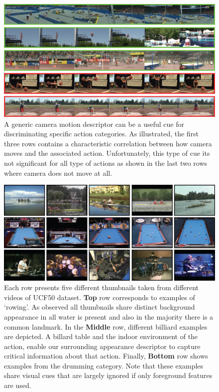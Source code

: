 \begin{figure}[t!]
\begin{center}
\includegraphics[width=0.98\linewidth]{fig/camMotion.png}
\end{center}
\caption{A generic camera motion descriptor can be a useful cue for discriminating specific action categories. As illustrated, the first three rows contains a characteristic correlation between how camera moves and the associated action. Unfortunately, this type of cue its not significant for all type of actions as shown in the last two rows where camera does not move at all.}
\label{fig:camMotion_example}
\end{figure}

\begin{figure}[t!]
\begin{center}
\includegraphics[width=0.98\linewidth]{fig/sift.png}
\end{center}
\caption{Each row presents five different thumbnails taken from different videos of UCF50 dataset. \textbf{Top} row corresponds to examples of `rowing'. As observed all thumbnails share distinct background appearance \ie in all water is present and also in the majority there is a common landmark. In the \textbf{Middle} row, different billiard examples are depicted. A billard table and the indoor environment of the action, enable our surrounding appearance descriptor to capture critical information about that action. Finally, \textbf{Bottom} row shows examples from the drumming category. Note that these examples share visual cues that are largely ignored if only foreground features are used.}
\label{fig:sift_example}
\end{figure}



